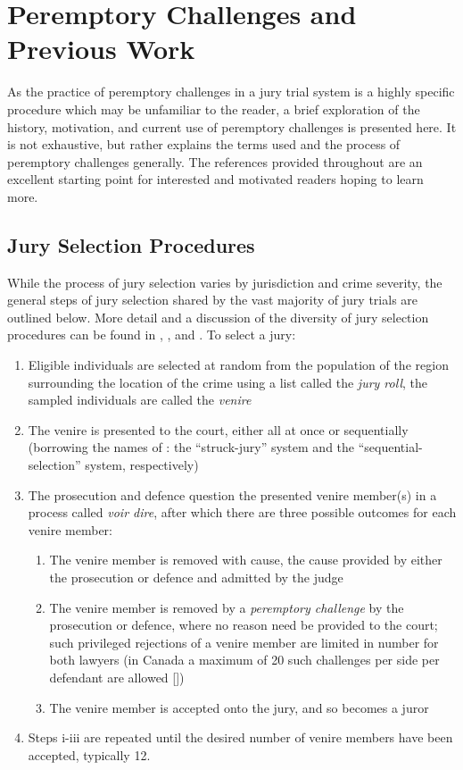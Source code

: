 \section{Peremptory Challenges and Previous Work} \label{c:background}

As the practice of peremptory challenges in a jury trial system is a highly specific procedure which may be unfamiliar to the
reader, a brief exploration of the history, motivation, and current use of peremptory challenges is presented here. It is not
exhaustive, but rather explains the terms used and the process of peremptory challenges generally. The references provided
throughout are an excellent starting point for interested and motivated readers hoping to learn more.

\subsection{Jury Selection Procedures} \label{sec:jurysel}

While the process of jury selection varies by jurisdiction and crime severity, the general steps of jury selection shared by the
vast majority of jury trials are outlined below. More detail and a discussion of the diversity of jury selection procedures can be
found in \cite{ford2010}, \cite{hansvidjudging}, and \cite{vandykejurysel}. To select a jury:

\begin{enumerate}
  \item Eligible individuals are selected at random from the population of the region surrounding the location of the crime using
    a list called the \textit{jury roll}, the sampled individuals are called the \textit{venire}
  \item The venire is presented to the court, either all at once or sequentially (borrowing the names of \cite{ford2010}: the
    ``struck-jury'' system and the ``sequential-selection'' system, respectively)
  \item The prosecution and defence question the presented venire member(s) in a process called \textit{voir dire}, after which there are three possible
    outcomes for each venire member:
    \begin{enumerate}
      \item The venire member is removed with cause, the cause provided by either the prosecution or defence and admitted by
        the judge
      \item The venire member is removed by a \textit{peremptory challenge} by the prosecution or defence, where no reason
        need be provided to the court; such privileged rejections of a venire member are limited in number for both lawyers (in
        Canada a maximum of 20 such challenges per side per defendant are allowed [\cite{perempchallaw}])
      \item The venire member is accepted onto the jury, and so becomes a juror
    \end{enumerate}
  \item Steps i-iii are repeated until the desired number of venire members have been accepted, typically 12.
\end{enumerate}

